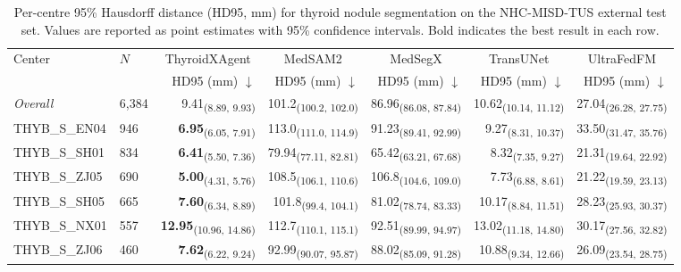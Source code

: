 \begin{table}[p]
\centering
\caption{Per-centre 95\% Hausdorff distance (HD95, mm) for thyroid nodule segmentation on the NHC-MISD-TUS external test set. Values are reported as point estimates with 95\% confidence intervals. Bold indicates the best result in each row.}
\label{tab:nodule_hd95}
\footnotesize
\setlength{\tabcolsep}{4pt}
\begin{tabular}{llrrrrr}
\toprule
\multirow{2}{*}{Center} & \multirow{2}{*}{$N$} & \multicolumn{1}{c}{ThyroidXAgent} & \multicolumn{1}{c}{MedSAM2} & \multicolumn{1}{c}{MedSegX} & \multicolumn{1}{c}{TransUNet} & \multicolumn{1}{c}{UltraFedFM} \\
\cmidrule(lr){3-3} \cmidrule(lr){4-4} \cmidrule(lr){5-5} \cmidrule(lr){6-6} \cmidrule(lr){7-7}
 & & HD95 (mm) $\downarrow$ & HD95 (mm) $\downarrow$ & HD95 (mm) $\downarrow$ & HD95 (mm) $\downarrow$ & HD95 (mm) $\downarrow$ \\
\midrule
\textit{Overall} & 6,384 & 9.41\textsubscript{(8.89, 9.93)} & 101.2\textsubscript{(100.2, 102.0)} & 86.96\textsubscript{(86.08, 87.84)} & 10.62\textsubscript{(10.14, 11.12)} & 27.04\textsubscript{(26.28, 27.75)} \\
\midrule
THYB\_S\_EN04 & 946 & \textbf{6.95}\textsubscript{(6.05, 7.91)} & 113.0\textsubscript{(111.0, 114.9)} & 91.23\textsubscript{(89.41, 92.99)} & 9.27\textsubscript{(8.31, 10.37)} & 33.50\textsubscript{(31.47, 35.76)} \\
THYB\_S\_SH01 & 834 & \textbf{6.41}\textsubscript{(5.50, 7.36)} & 79.94\textsubscript{(77.11, 82.81)} & 65.42\textsubscript{(63.21, 67.68)} & 8.32\textsubscript{(7.35, 9.27)} & 21.31\textsubscript{(19.64, 22.92)} \\
THYB\_S\_ZJ05 & 690 & \textbf{5.00}\textsubscript{(4.31, 5.76)} & 108.5\textsubscript{(106.1, 110.6)} & 106.8\textsubscript{(104.6, 109.0)} & 7.73\textsubscript{(6.88, 8.61)} & 21.22\textsubscript{(19.59, 23.13)} \\
THYB\_S\_SH05 & 665 & \textbf{7.60}\textsubscript{(6.34, 8.89)} & 101.8\textsubscript{(99.4, 104.1)} & 81.02\textsubscript{(78.74, 83.33)} & 10.17\textsubscript{(8.84, 11.51)} & 28.23\textsubscript{(25.93, 30.37)} \\
THYB\_S\_NX01 & 557 & \textbf{12.95}\textsubscript{(10.96, 14.86)} & 112.7\textsubscript{(110.1, 115.1)} & 92.51\textsubscript{(89.99, 94.97)} & 13.02\textsubscript{(11.18, 14.80)} & 30.17\textsubscript{(27.56, 32.82)} \\
THYB\_S\_ZJ06 & 460 & \textbf{7.62}\textsubscript{(6.22, 9.24)} & 92.99\textsubscript{(90.07, 95.87)} & 88.02\textsubscript{(85.09, 91.28)} & 10.88\textsubscript{(9.34, 12.66)} & 26.09\textsubscript{(23.54, 28.75)} \\

\end{tabular}
\end{table}
